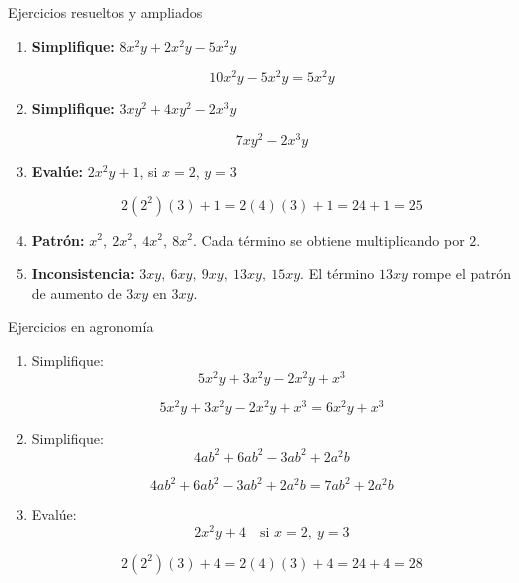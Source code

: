 \documentclass[handout,aspectratio=169,12pt]{beamer}
\begin{document}
	\begin{frame}{Ejercicios resueltos y ampliados}
		\small
		\begin{enumerate}
			\item \textbf{Simplifique:} \(8x^2y + 2x^2y - 5x^2y\)
			
			\pause
			\[
			10x^2y - 5x^2y = 5x^2y
			\]
			
			\pause
			\item \textbf{Simplifique:} \(3xy^2 + 4xy^2 - 2x^3y\)
			
			\pause
			\[
			7xy^2 - 2x^3y
			\]
			
			\pause
			\item \textbf{Evalúe:} \(2x^2y + 1\), si \(x=2\), \(y=3\)
			
			\pause
			\[
			2(2^2)(3) + 1 = 2(4)(3) + 1 = 24 + 1 = 25
			\]
			
			\pause
			\item \textbf{Patrón:} \(x^2,\ 2x^2,\ 4x^2,\ 8x^2\). \pause Cada término se obtiene multiplicando por \(2\).
			
			\pause
			\item \textbf{Inconsistencia:} \(3xy,\ 6xy,\ 9xy,\ 13xy,\ 15xy\). \pause
			El término \(13xy\) rompe el patrón de aumento de \(3xy\) en \(3xy\).
		\end{enumerate}
	\end{frame}
	
	\begin{frame}{Ejercicios en agronomía}
		\small
		\begin{enumerate}
			\item Simplifique:
			\[
			5x^2y + 3x^2y - 2x^2y + x^3
			\]
			
			\pause
			\[
			5x^2y + 3x^2y - 2x^2y + x^3=6x^2y + x^3
			\]
			
			\pause
			\item Simplifique:
			\[
			4ab^2 + 6ab^2 - 3ab^2 + 2a^2b
			\]
			
			\[
			4ab^2 + 6ab^2 - 3ab^2 + 2a^2b=7ab^2 + 2a^2b
			\]
			
			\pause
			\item Evalúe:
			\[
			2x^2y + 4 \quad \text{si } x=2,\ y=3
			\]
			
			\pause
			\[
			2(2^2)(3) + 4 = 2(4)(3) + 4 = 24 + 4 = 28
			\]
						
		\end{enumerate}
	\end{frame}
	
\end{document}
